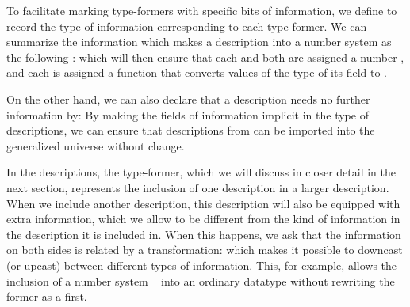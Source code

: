 To facilitate marking type-formers with specific bits of information, we define 
to record the type of information corresponding to each type-former. We can summarize the information which makes a description into a number system as the following :
which will then ensure that each  and  both are assigned a number \bN{}, and each  is assigned a function that converts values of the type of its field to \bN{}.

On the other hand, we can also declare that a description needs no further information by:
By making the fields of information implicit in the type of descriptions, we can ensure that descriptions from  can be imported into the generalized universe without change.


In the descriptions, the  type-former, which we will discuss in closer detail in the next section, represents the inclusion of one description in a larger description. When we include another description, this description will also be equipped with extra information, which we allow to be different from the kind of information in the description it is included in. When this happens, we ask that the information on both sides is related by a transformation:
which makes it possible to downcast (or upcast) between different types of information. This, for example, allows the inclusion of a number system \  into an ordinary datatype  without rewriting the former as a  first.


